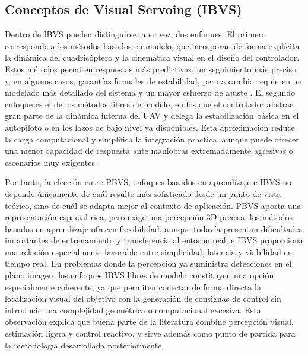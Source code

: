 \vspace{0.3cm}

\subsection{Conceptos de Visual Servoing (IBVS)}

Dentro de IBVS pueden distinguirse, a su vez, dos enfoques. El primero corresponde a los métodos basados en modelo, que incorporan de forma explícita la dinámica del cuadricóptero y la cinemática visual en el diseño del controlador. Estos métodos permiten respuestas más predictivas, un seguimiento más preciso y, en algunos casos, garantías formales de estabilidad, pero a cambio requieren un modelado más detallado del sistema y un mayor esfuerzo de ajuste \cite{asl2014adaptive, yang2024high, yan2024precise}. El segundo enfoque es el de los métodos libres de modelo, en los que el controlador abstrae gran parte de la dinámica interna del UAV y delega la estabilización básica en el autopiloto o en los lazos de bajo nivel ya disponibles. Esta aproximación reduce la carga computacional y simplifica la integración práctica, aunque puede ofrecer una menor capacidad de respuesta ante maniobras extremadamente agresivas o escenarios muy exigentes \cite{wyder2019autonomous, lee2023air, vanDerAa2024ibvs}.

\vspace{0.3cm}

Por tanto, la elección entre PBVS, enfoques basados en aprendizaje e IBVS no depende únicamente de cuál resulte más sofisticado desde un punto de vista teórico, sino de cuál se adapta mejor al contexto de aplicación. PBVS aporta una representación espacial rica, pero exige una percepción 3D precisa; los métodos basados en aprendizaje ofrecen flexibilidad, aunque todavía presentan dificultades importantes de entrenamiento y transferencia al entorno real; e IBVS proporciona una relación especialmente favorable entre simplicidad, latencia y viabilidad en tiempo real. En problemas donde la percepción ya suministra detecciones en el plano imagen, los enfoques IBVS libres de modelo constituyen una opción especialmente coherente, ya que permiten conectar de forma directa la localización visual del objetivo con la generación de consignas de control sin introducir una complejidad geométrica o computacional excesiva. Esta observación explica que buena parte de la literatura combine percepción visual, estimación ligera y control reactivo, y sirve además como punto de partida para la metodología desarrollada posteriormente.



